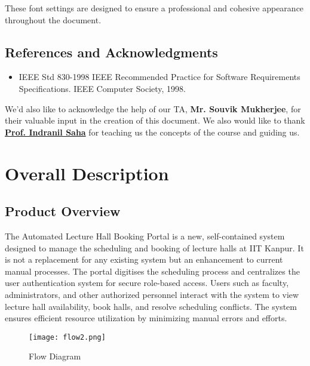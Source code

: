 \documentclass[a4paper,12pt]{article}
\begin{document}
These font settings are designed to ensure a professional and cohesive appearance throughout the document.

\subsection{References and Acknowledgments} \label{subsec:refs}
\begin{itemize}
    \item IEEE Std 830-1998 IEEE Recommended Practice for Software Requirements Specifications. IEEE Computer Society, 1998.

\end{itemize}
We’d also like to acknowledge the help of our TA, \textbf{Mr. Souvik Mukherjee}, for their valuable input in the creation of this document. We also would like to thank \textbf{\href{https://www.cse.iitk.ac.in/users/isaha/}{Prof. Indranil Saha}} for teaching us the concepts of the course and guiding us.

\newpage

\section{Overall Description} \label{sec:description}
\subsection{Product Overview} \label{subsec:overview}
The Automated Lecture Hall Booking Portal is a new, self-contained system designed to manage the scheduling and booking of lecture halls at IIT Kanpur. It is not a replacement for any existing system but an enhancement to current manual processes. The portal digitises the scheduling process and centralizes the user authentication system for secure role-based access. Users such as faculty, administrators, and other authorized personnel interact with the system to view lecture hall availability, book halls, and resolve scheduling conflicts. The system ensures efficient resource utilization by minimizing manual errors and efforts.

\begin{figure}[h] %
    \centering
    \texttt{[image: flow2.png]} %
    \caption{Flow Diagram}
    \label{fig:Flow Diagram} %
\end{figure}
\end{document}
